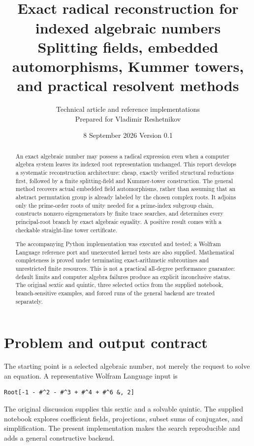 \documentclass[11pt,letterpaper]{article}
\title{\vspace{-1em}{\color{ink}\Huge SystematicRadicals}\\[.5em]
 {\Large Exact radical reconstruction for indexed algebraic numbers}\\[.6em]
 {\large Splitting fields, embedded automorphisms, Kummer towers,\\
 and practical resolvent methods}}
\author{Technical article and reference implementations\\
 Prepared for Vladimir Reshetnikov}
\date{8 September 2026 \quad\textbullet\quad Version 0.1}
\theoremstyle{definition}\newtheorem{definition}[theorem]{Definition}
\theoremstyle{remark}\newtheorem{remark}[theorem]{Remark}
\begin{document}
\maketitle\thispagestyle{empty}
\begin{abstract}
An exact algebraic number may possess a radical expression even when a
computer algebra system leaves its indexed root representation unchanged.
This report develops a systematic reconstruction architecture: cheap,
exactly verified structural reductions first, followed by a finite
splitting-field and Kummer-tower construction. The general method recovers
actual embedded field automorphisms, rather than assuming that an abstract
permutation group is already labeled by the chosen complex roots. It adjoins
only the prime-order roots of unity needed for a prime-index subgroup chain,
constructs nonzero eigengenerators by finite trace searches, and determines
every principal-root branch by exact algebraic equality. A positive result
comes with a checkable straight-line tower certificate.

The accompanying Python implementation was executed and tested; a Wolfram
Language reference port and unexecuted kernel tests are also supplied.
Mathematical completeness is proved under terminating exact-arithmetic
subroutines and unrestricted finite resources. This is not a practical
all-degree performance guarantee: default limits and computer algebra
failures produce an explicit inconclusive status. The original sextic and
quintic, three selected octics from the supplied notebook, branch-sensitive
examples, and forced runs of the general backend are treated separately.
\end{abstract}
\begin{center}
\end{center}
\clearpage
\begingroup\small\setlength{\parskip}{0pt}
\tableofcontents
\endgroup
\clearpage

\section{Problem and output contract}
\label{sec:contract}
The starting point is a selected algebraic number, not merely the request to
solve an equation. A representative Wolfram Language input is
\begin{lstlisting}
Root[-1 - #^2 - #^3 + #^4 + #^6 &, 2]
\end{lstlisting}
The original discussion \cite{question} supplies this sextic and a solvable
quintic. The supplied notebook explores coefficient fields,
projections, subset sums of conjugates, and simplification. The present
implementation makes the search reproducible and adds a general constructive
backend.
\end{document}
